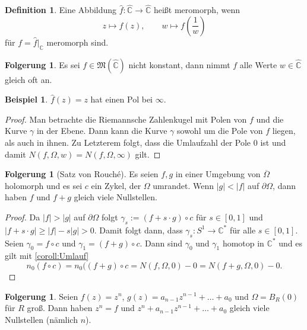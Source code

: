 \documentclass[11pt,titlepage]{article}
\theoremstyle{definition}
\newtheorem{corollary}[theorem]{Folgerung}
\newtheorem{definition}[theorem]{Definition}
\newtheorem{example}[theorem]{Beispiel}
\theoremstyle{remark}
\begin{document}
	\begin{definition}
		Eine Abbildung $\hat{f}:\hat{\mathbb{C}}\to\hat{\mathbb{C}}$ heißt meromorph, wenn 
		\[ z\mapsto f(z), \qquad w\mapsto f\left(\frac{1}{w}\right) \]
		für $f=\hat{f}|_{\mathbb{C}}$ meromorph sind.
	\end{definition}
	
	\begin{corollary}
		Es sei $f\in\mathfrak{M}(\hat{\mathbb{C}})$ nicht konstant, dann nimmt $f$ alle Werte 
		$w\in\hat{\mathbb{C}}$ gleich oft an.
	\end{corollary}
	
	\begin{example}
		$\hat{f}(z)=z$ hat einen Pol bei $\infty$.
	\end{example}
	
	\begin{proof}
	
		
		
		Man betrachte die Riemannsche Zahlenkugel mit Polen von $f$ und die Kurve $\gamma$ in der 
		Ebene. Dann kann die Kurve $\gamma$ sowohl um die Pole von $f$ liegen, als auch in ihnen.
		Zu Letzterem folgt, dass die Umlaufzahl der Pole $0$ ist und damit 
		$N(f,\Omega,w)=N(f,\Omega,\infty)$ gilt.
	\end{proof}
	
	\begin{corollary}[Satz von Rouché]
		Es seien $f,g$ in einer Umgebung von $\overline{\Omega}$ holomorph und es sei $c$ ein Zykel, 
		der $\Omega$ umrandet. Wenn $|g|<|f|$ auf $\partial\Omega$, dann haben $f$ und $f+g$ 
		gleich viele Nullstellen.
	\end{corollary}
	
	\begin{proof}
		Da $|f|>|g|$ auf $\partial\Omega$ folgt $\gamma_s := (f+s\cdot g)\circ c$ für $s\in [0,1]$ und 
		$|f+s\cdot g|\geq |f|-s|g| >0$. Damit folgt dann, dass $\gamma_s:S^1\to\mathbb{C}^*$ für alle 
		$s\in [0,1]$. Seien $\gamma_0=f\circ c$ und $\gamma_1=(f+g)\circ c$. Dann sind 
		$\gamma_0$ und $\gamma_1$ homotop in $\mathbb{C}^*$ und es gilt mit \ref{coroll:Umlauf}
		\[ n_0(f\circ c) =n_0((f+g)\circ c = N(f,\Omega,0)-0=N(f+g,\Omega,0)-0. \]
	\end{proof}
	
	\begin{corollary}
		Seien $f(z)=z^n$, $g(z)=a_{n-1}z^{n-1}+\ldots+a_0$ und $\Omega=B_R(0)$ für $R$ groß. Dann 
		haben $z^n=f$ und $z^n+a_{n-1}z^{n-1}+\ldots+a_0$ gleich viele Nullstellen (nämlich $n$).
	\end{corollary}
	
\end{document}
